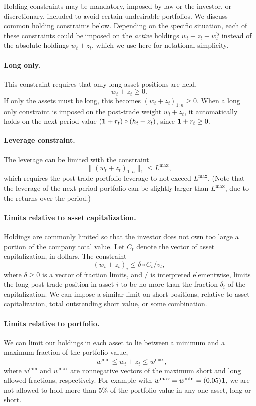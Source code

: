 \documentclass[openany]{now}
\newcommand{\wb}{w^\mathrm{b}}
\begin{document}
Holding constraints may be mandatory, imposed by law or the investor,
or discretionary, included to avoid certain undesirable portfolios.
We discuss common holding constraints below.
Depending on the specific situation, each of these constraints could be imposed
on the \emph{active} holdings $w_t + z_t - \wb_t$ instead of the absolute
holdings $w_t + z_t$, which we use here for notational simplicity.

\paragraph{Long only.}
This constraint requires that only long asset positions are held,
\[
w_t + z_t \geq 0.
\]
If only the assets must be long, this becomes $(w_t + z_t)_{1:n} \geq 0$.
When a long only constraint is imposed on the post-trade weight $w_t+z_t$,
it automatically holds on the next period value $(\mathbf 1+r_t)\circ(h_t+z_t)$,
since $\mathbf 1 + r_t \geq 0$.

\paragraph{Leverage constraint.}
The leverage can be limited with the constraint
\[
\|(w_t + z_t)_{1:n} \|_1 \leq L^\mathrm{max},
\]
which requires the post-trade portfolio leverage to not exceed $L^\mathrm{max}$.
(Note that the leverage of the next period portfolio can be slightly
larger than $L^\mathrm{max}$, due to the returns over the period.)

\paragraph{Limits relative to asset capitalization.}
Holdings are commonly limited so that the investor does not own
too large a portion of the company total value.
Let $C_t$ denote the vector of asset capitalization, in dollars.
The constraint
\[
(w_t + z_t)_i \leq \delta \circ C_t/v_t,
\]
where $\delta \geq 0$ is a vector of fraction limits, and $/$ is
interpreted elementwise,
limits the long post-trade position
in asset $i$ to be no more than the fraction $\delta_i$ of the capitalization.
We can impose a similar limit on short positions, relative to
asset capitalization, total outstanding short value, or some combination.

\paragraph{Limits relative to portfolio.}
We can limit our holdings in each asset to lie between a minimum and
a maximum fraction of the portfolio value,
\[
-w^\mathrm{min} \leq w_t+z_t \leq w^\mathrm{max},
\]
where $w^\mathrm{min}$ and $w^\mathrm{max}$ are nonnegative
vectors of the maximum short and long allowed fractions, respectively.
For example with $w^\mathrm{max}=w^\mathrm{min} = (0.05) \mathbf 1$,
we are not allowed to hold more than 5\% of the portfolio value in any
one asset, long or short.
\end{document}
